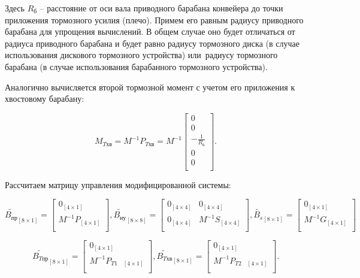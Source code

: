 Здесь $ R_{\text{б}} $ -- расстояние от оси вала приводного барабана конвейера до точки приложения тормозного усилия (плечо). Примем его равным радиусу приводного барабана для упрощения вычислений. В общем случае оно будет отличаться от радиуса приводного барабана и будет равно радиусу тормозного диска (в случае использования дискового тормозного устройства) или~радиусу тормозного барабана (в случае использования барабанного тормозного устройства).

Аналогично вычисляется второй тормозной момент с учетом его приложения к хвостовому барабану:

$$ M_{T \text{хв}} = M^{-1} P_{T \text{хв}} = M^{-1}
	\begin{bmatrix}
	0                         \\
	0                         \\
	 - \frac{1}{R_{\text{б}}} \\
	0                         \\
	0                         \\
	\end{bmatrix}.
 $$

Рассчитаем матрицу управления модифицированной системы:

$$
\tilde{B_{\text{пр}}}_{[8\times1]} = 
\begin{bmatrix}
 0_{[4\times1]}                      \\
 M^{-1}P_{[4\times1]}                \\
\end{bmatrix},
\tilde{B_{\text{ну}}}_{[8\times8]} = 
\begin{bmatrix}
 0_{[4\times4]} & 0_{[4\times4]}       \\
 0_{[4\times4]} & M^{-1}S_{[4\times4]} \\
\end{bmatrix},
\tilde{B_s}_{[8\times1]} = 
\begin{bmatrix}
 0_{[4\times1]}                      \\
 M^{-1}G_{[4\times1]}                \\
\end{bmatrix}
$$

$$
\tilde{B_{T \text{пр}}}_{[8\times1]} = 
\begin{bmatrix}
 0_{[4\times1]}                      \\
 M^{-1}P_{T1  \quad [4\times1]}      \\
\end{bmatrix},
\tilde{B_{T \text{хв}}}_{[8\times1]} = 
\begin{bmatrix}
 0_{[4\times1]}                      \\
 M^{-1}P_{T2 \quad [4\times1]}       \\
\end{bmatrix}.
$$

